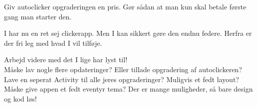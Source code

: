 \begin{exercise}
	Giv autoclicker opgraderingen en pris. Gør sådan at man kun skal betale første gang man starter den. 
\end{exercise}
I har nu en ret sej clickerapp. Men I kan sikkert gøre den endnu federe. Herfra er der fri leg med hvad I vil tilføje. 
\begin{exercise}
	Arbejd videre med det I lige har lyst til! \\
	Måske lav nogle flere opdateringer? Eller tillade opgradering af autoclickeren? Lave en seperat Activity til alle jeres opgraderinger?
	Muligvis et fedt layout? Måske give appen et fedt eventyr tema? Der er mange muligheder, så bare design og kod løs!
\end{exercise}